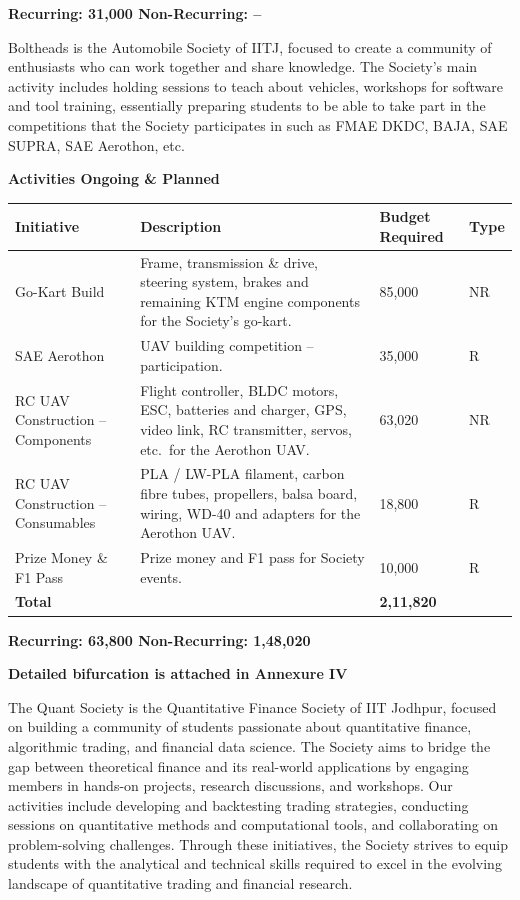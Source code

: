 \documentclass[11pt,letterpaper]{article}
\newcommand{\rs}{{\rupee}}
\newcommand{\society}[1]{\par\bigskip{\sffamily\bfseries\large #1}\par}
\newcommand{\subhead}[1]{\par{\bfseries #1}\par}
\begin{document}
\textbf{Recurring: \rs31,000 \quad Non-Recurring: --}

\clearpage
\society{5.\ \ Boltheads}

Boltheads is the Automobile Society of IITJ, focused to create a community of enthusiasts who can work together and share knowledge. The Society's main activity includes holding sessions to teach about vehicles, workshops for software and tool training, essentially preparing students to be able to take part in the competitions that the Society participates in such as FMAE DKDC, BAJA, SAE SUPRA, SAE Aerothon, etc.

\subhead{Activities Ongoing \& Planned}
\begin{longtable}{|L{0.25\textwidth}|L{0.40\textwidth}|C{0.17\textwidth}|C{0.06\textwidth}|}
\hline
\textbf{Initiative} & \textbf{Description} & \textbf{Budget Required} & \textbf{Type}\\ \hline
Go-Kart Build & Frame, transmission \& drive, steering system, brakes and remaining KTM engine components for the Society's go-kart. & \rs85,000 & NR\\ \hline
SAE Aerothon & UAV building competition -- participation. & \rs35,000 & R\\ \hline
RC UAV Construction -- Components & Flight controller, BLDC motors, ESC, batteries and charger, GPS, video link, RC transmitter, servos, etc.\ for the Aerothon UAV. & \rs63,020 & NR\\ \hline
RC UAV Construction -- Consumables & PLA / LW-PLA filament, carbon fibre tubes, propellers, balsa board, wiring, WD-40 and adapters for the Aerothon UAV. & \rs18,800 & R\\ \hline
Prize Money \& F1 Pass & Prize money and F1 pass for Society events. & \rs10,000 & R\\ \hline
\textbf{Total} & & \textbf{\rs2,11,820} & \\ \hline
\end{longtable}

\textbf{Recurring: \rs63,800 \quad Non-Recurring: \rs1,48,020}

\textbf{Detailed bifurcation is attached in Annexure IV}

\clearpage
\society{6.\ \ Quant Society}

The Quant Society is the Quantitative Finance Society of IIT Jodhpur, focused on building a community of students passionate about quantitative finance, algorithmic trading, and financial data science. The Society aims to bridge the gap between theoretical finance and its real-world applications by engaging members in hands-on projects, research discussions, and workshops. Our activities include developing and backtesting trading strategies, conducting sessions on quantitative methods and computational tools, and collaborating on problem-solving challenges. Through these initiatives, the Society strives to equip students with the analytical and technical skills required to excel in the evolving landscape of quantitative trading and financial research.
\end{document}
